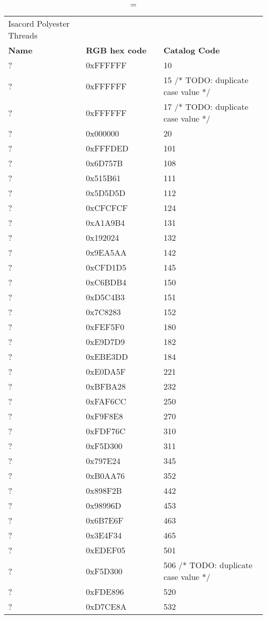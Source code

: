 
\begin{longtable}{p{0.3\linewidth} p{0.3\linewidth} p{0.4\linewidth}}
\caption = {Isacord Polyester Threads}
\label{tblr:isacord}\\
\textbf{Name} & \textbf{RGB hex code} & \textbf{Catalog Code} \\
? &  0xFFFFFF &  10\\
? &  0xFFFFFF &  15  /* TODO: duplicate case value */\\
? &  0xFFFFFF &  17  /* TODO: duplicate case value */\\
? &  0x000000 &  20\\
? &  0xFFFDED &  101\\
? &  0x6D757B &  108\\
? &  0x515B61 &  111\\
? &  0x5D5D5D &  112\\
? &  0xCFCFCF &  124\\
? &  0xA1A9B4 &  131\\
? &  0x192024 &  132\\
? &  0x9EA5AA &  142\\
? &  0xCFD1D5 &  145\\
? &  0xC6BDB4 &  150\\
? &  0xD5C4B3 &  151\\
? &  0x7C8283 &  152\\
? &  0xFEF5F0 &  180\\
? &  0xE9D7D9 &  182\\
? &  0xEBE3DD &  184\\
? &  0xE0DA5F &  221\\
? &  0xBFBA28 &  232\\
? &  0xFAF6CC &  250\\
? &  0xF9F8E8 &  270\\
? &  0xFDF76C &  310\\
? &  0xF5D300 &  311\\
? &  0x797E24 &  345\\
? &  0xB0AA76 &  352\\
? &  0x898F2B &  442\\
? &  0x98996D &  453\\
? &  0x6B7E6F &  463\\
? &  0x3E4F34 &  465\\
? &  0xEDEF05 &  501\\
? &  0xF5D300 &  506   /* TODO: duplicate case value */\\
? &  0xFDE896 &  520\\
? &  0xD7CE8A &  532\\

\end{longtable}
